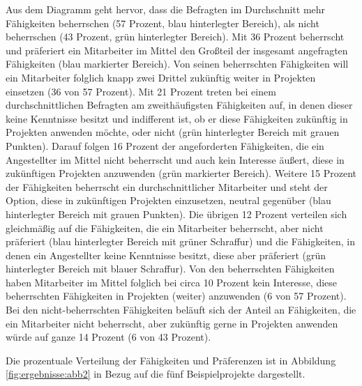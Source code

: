 Aus dem Diagramm geht hervor, dass die Befragten im Durchschnitt mehr Fähigkeiten beherrschen (57 Prozent, blau hinterlegter Bereich), als nicht beherrschen (43 Prozent, grün hinterlegter Bereich).
Mit 36 Prozent beherrscht und präferiert ein Mitarbeiter im Mittel den Großteil der insgesamt angefragten Fähigkeiten (blau markierter Bereich).
Von seinen beherrschten Fähigkeiten will ein Mitarbeiter folglich knapp zwei Drittel zukünftig weiter in Projekten einsetzen (36 von 57 Prozent).
Mit 21 Prozent treten bei einem durchschnittlichen Befragten am zweithäufigsten Fähigkeiten auf, in denen dieser keine Kenntnisse besitzt und indifferent ist, ob er diese Fähigkeiten zukünftig in Projekten anwenden möchte, oder nicht (grün hinterlegter Bereich mit grauen Punkten).
Darauf folgen 16 Prozent der angeforderten Fähigkeiten, die ein Angestellter im Mittel nicht beherrscht und auch kein Interesse äußert, diese in zukünftigen Projekten anzuwenden (grün markierter Bereich).
Weitere 15 Prozent der Fähigkeiten beherrscht ein durchschnittlicher Mitarbeiter und steht der Option, diese in zukünftigen Projekten einzusetzen, neutral gegenüber (blau hinterlegter Bereich mit grauen Punkten). 
Die übrigen 12 Prozent verteilen sich gleichmäßig auf die Fähigkeiten, die ein Mitarbeiter beherrscht, aber nicht präferiert (blau hinterlegter Bereich mit grüner Schraffur) und die Fähigkeiten, in denen ein Angestellter keine Kenntnisse besitzt, diese aber präferiert (grün hinterlegter Bereich mit blauer Schraffur).
Von den beherrschten Fähigkeiten haben Mitarbeiter im Mittel folglich bei circa 10 Prozent kein Interesse, diese beherrschten Fähigkeiten in Projekten (weiter) anzuwenden (6 von 57 Prozent).
Bei den nicht-beherrschten Fähigkeiten beläuft sich der Anteil an Fähigkeiten, die ein Mitarbeiter nicht beherrscht, aber zukünftig gerne in Projekten anwenden würde auf ganze 14 Prozent (6 von 43 Prozent).

Die prozentuale Verteilung der Fähigkeiten und Präferenzen ist in Abbildung \ref{fig:ergebnisse:abb2} in Bezug auf die fünf Beispielprojekte dargestellt.

